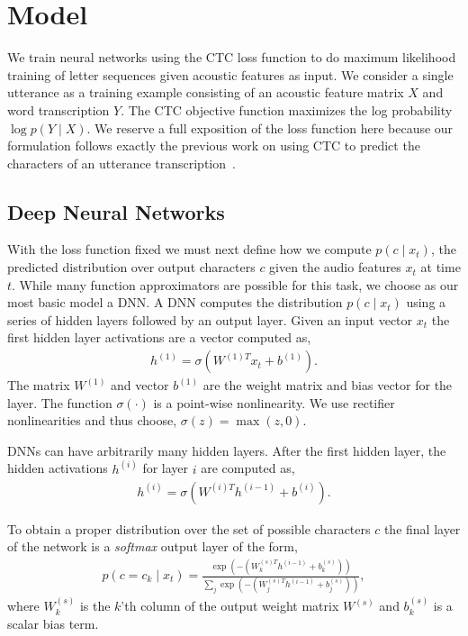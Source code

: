 \section{Model}
\label{sec:first_pass:model}

We train neural networks using the CTC loss function to do maximum
likelihood training of letter sequences given acoustic features as
input. We consider a single utterance as a training example consisting
of an acoustic feature matrix $X$ and word transcription $Y$. The CTC
objective function maximizes the log probability $\log p(Y \mid X)$. We
reserve a full exposition of the loss function here because our
formulation follows exactly the previous work on using CTC to predict
the characters of an utterance transcription~\cite{graves2014, graves2006}. 

\subsection{Deep Neural Networks}
\label{sec:first_pass:model:dnn}

With the loss function fixed we must next define how we compute $p(c \mid
x_t)$, the predicted distribution over output characters $c$ given the audio
features $x_t$ at time $t$. While many function approximators are possible for
this task, we choose as our most basic model a DNN. A DNN computes the
distribution $p(c \mid x_t)$ using a series of hidden layers followed by an output
layer. Given an input vector $x_t$ the first hidden layer activations are a
vector computed as,
\begin{align*}
  h^{(1)} = \sigma(W^{(1)T} x_t + b^{(1)}).
\end{align*}
The matrix $W^{(1)}$ and vector $b^{(1)}$ are the weight matrix and bias vector
for the layer. The function $\sigma(\cdot)$ is a point-wise nonlinearity. We
use rectifier nonlinearities and thus choose, $\sigma(z) = \max (z, 0)$.

DNNs can have arbitrarily many hidden layers. After the first hidden
layer, the hidden activations $h^{(i)}$ for layer $i$ are computed as,
\begin{align*}
  h^{(i)} = \sigma(W^{(i)T} h^{(i-1)} + b^{(i)}).
\end{align*}

To obtain a proper distribution over the set of possible characters $c$ the
final layer of the network is a \emph{softmax} output layer of the form,
\begin{align*}
  p(c=c_k \mid x_t) = \frac{\exp(- ( W^{(s)T}_k h^{(i-1)} + b^{(s)}_k))}
  {\sum_j \exp(- ( W^{(s)T}_j h^{(i-1)} + b^{(s)}_j))},
\end{align*}
where $W^{(s)}_k$ is the $k$'th column of the output weight matrix $W^{(s)}$
and $b^{(s)}_k$ is a scalar bias term. 

